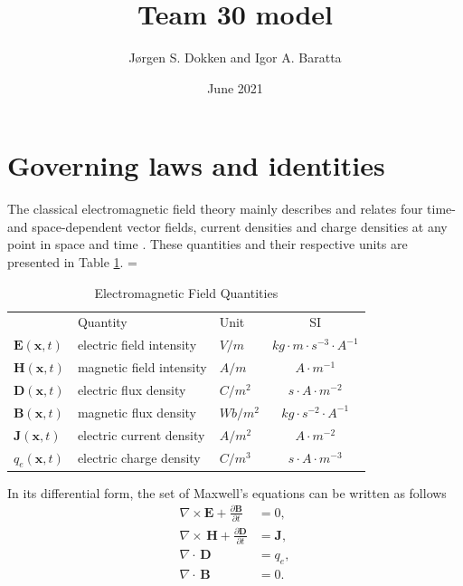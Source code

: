 \documentclass{article}
\title{Team 30 model}
\author{Jørgen S. Dokken and Igor A. Baratta}
\date{June 2021}
\newcommand{\mbf}[1]{\mathbf{#1}}
\begin{document}
\maketitle
\section{Governing laws and identities}

The classical electromagnetic field theory mainly describes and relates
four time-and space-dependent vector fields, current densities and
charge densities at any point in space and time
\cite{balanis2012advanced}. These quantities and their respective units
are presented in Table \ref{table:em_quantities}.
=
\begin{table}[!hb]
\centering
\caption{Electromagnetic Field Quantities}
\label{emquantities}
\begin{tabular}{|l|l|l|c|}
\cline{1-4}
      & Quantity & Unit & SI \\ \cline{1-4}
$ \mbf{E}(\textbf{x},t)$ & electric field intensity      & $V/m$ & $kg\cdot m\cdot s^{-3}\cdot A^{-1}$ \\
$ \mbf{H}(\textbf{x},t)$ & magnetic field intensity      & $A/m$ & $A\cdot m^{-1}$\\
$ \mbf{D}(\textbf{x},t)$ & electric flux density         & $C/m^2$ & $s \cdot A \cdot m^{-2}$   \\
$ \mbf{B}(\textbf{x},t)$ & magnetic flux density         & $Wb/m^2$ & $kg\cdot s^{-2}\cdot A^{-1}$   \\
$ \mbf{J}(\textbf{x},t)$ & electric current density         & $A/m^2$  & $A\cdot m^{-2}$  \\
$\textit{q}_e(\textbf{x},t)$ & electric charge density         & $C/m^3$ & $s\cdot A\cdot m^{-3}$    \\ \cline{1-4}
\end{tabular}
\label{table:em_quantities}
\end{table}

In its differential form, the set of Maxwell's equations can be written as follows
\begin{subequations}\label{eq:Maxwell}
    \begin{align}
    	\nabla \times \mbf{E} +  \frac{\partial \mbf{B}}{\partial t} &= 0, \label{faraday_simple}\\
    	\nabla \times \,  \mbf{H} +  \frac{\partial \mbf{D}}{\partial t} &=  \mbf{J}, \label{ampere_simple}\\
    	\nabla \cdot \,  \mbf{D} &= \textit{q}_{e}, \label{gaussE}\\
    	\nabla \cdot \,  \mbf{B} &= 0. \label{gaussM}
    \end{align}
\end{subequations}
\end{document}
